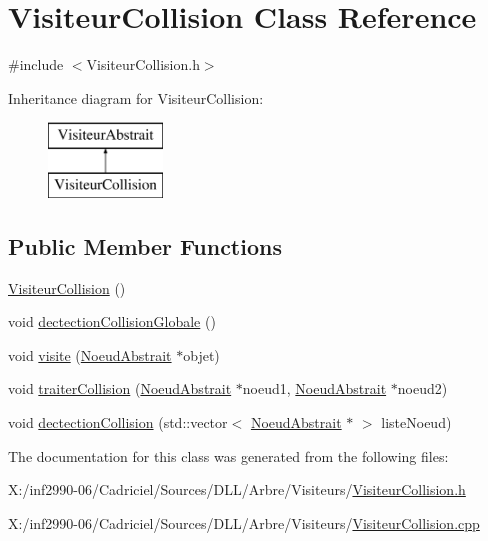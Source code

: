 \hypertarget{class_visiteur_collision}{\section{Visiteur\-Collision Class Reference}
\label{class_visiteur_collision}
}


{\ttfamily \#include $<$Visiteur\-Collision.\-h$>$}

Inheritance diagram for Visiteur\-Collision\-:\begin{figure}[H]
\begin{center}
\leavevmode
\includegraphics[height=2.000000cm]{class_visiteur_collision}
\end{center}
\end{figure}
\subsection*{Public Member Functions}
\begin{DoxyCompactItemize}
\item 
\hyperlink{group__inf2990_gadb7d5f275d9cf6cd9e9d74986058e700}{Visiteur\-Collision} ()
\item 
void \hyperlink{group__inf2990_ga29ee7ba632f5c95acac24243482c0232}{dectection\-Collision\-Globale} ()
\item 
void \hyperlink{group__inf2990_ga999f8c7d5c1f57332e615c44d8d95568}{visite} (\hyperlink{class_noeud_abstrait}{Noeud\-Abstrait} $\ast$objet)
\item 
void \hyperlink{group__inf2990_ga4c657ffb1bbba9dd0ddd356dfa8c849f}{traiter\-Collision} (\hyperlink{class_noeud_abstrait}{Noeud\-Abstrait} $\ast$noeud1, \hyperlink{class_noeud_abstrait}{Noeud\-Abstrait} $\ast$noeud2)
\item 
void \hyperlink{group__inf2990_ga029e144426fba67db28057e3a302ec57}{dectection\-Collision} (std\-::vector$<$ \hyperlink{class_noeud_abstrait}{Noeud\-Abstrait} $\ast$ $>$ liste\-Noeud)
\end{DoxyCompactItemize}


The documentation for this class was generated from the following files\-:\begin{DoxyCompactItemize}
\item 
X\-:/inf2990-\/06/\-Cadriciel/\-Sources/\-D\-L\-L/\-Arbre/\-Visiteurs/\hyperlink{_visiteur_collision_8h}{Visiteur\-Collision.\-h}\item 
X\-:/inf2990-\/06/\-Cadriciel/\-Sources/\-D\-L\-L/\-Arbre/\-Visiteurs/\hyperlink{_visiteur_collision_8cpp}{Visiteur\-Collision.\-cpp}\end{DoxyCompactItemize}
